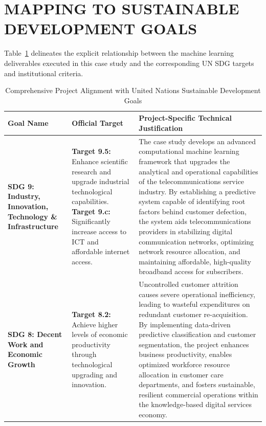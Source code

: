 \documentclass[12pt,a4paper]{report}
\begin{document}
\section{MAPPING TO SUSTAINABLE DEVELOPMENT GOALS}
Table~\ref{tab:sdg_mapping_full} delineates the explicit relationship between the machine learning deliverables executed in this case study and the corresponding UN SDG targets and institutional criteria.

\begin{table}[H]
\centering
\small
\begin{tabular}{|p{3.2cm}|p{2.4cm}|p{8.5cm}|}
\hline
\textbf{Goal Name} & \textbf{Official Target} & \textbf{Project-Specific Technical Justification} \\
\hline
\textbf{SDG 9: Industry, Innovation, Technology \& Infrastructure} & 
\textbf{Target 9.5:} Enhance scientific research and upgrade industrial technological capabilities. \newline \newline
\textbf{Target 9.c:} Significantly increase access to ICT and affordable internet access. & 
The case study develops an advanced computational machine learning framework that upgrades the analytical and operational capabilities of the telecommunications service industry. By establishing a predictive system capable of identifying root factors behind customer defection, the system aids telecommunications providers in stabilizing digital communication networks, optimizing network resource allocation, and maintaining affordable, high-quality broadband access for subscribers. \\
\hline
\textbf{SDG 8: Decent Work and Economic Growth} & 
\textbf{Target 8.2:} Achieve higher levels of economic productivity through technological upgrading and innovation. & 
Uncontrolled customer attrition causes severe operational inefficiency, leading to wasteful expenditures on redundant customer re-acquisition. By implementing data-driven predictive classification and customer segmentation, the project enhances business productivity, enables optimized workforce resource allocation in customer care departments, and fosters sustainable, resilient commercial operations within the knowledge-based digital services economy. \\
\hline
\end{tabular}
\caption{Comprehensive Project Alignment with United Nations Sustainable Development Goals}
\label{tab:sdg_mapping_full}
\end{table}
\end{document}
